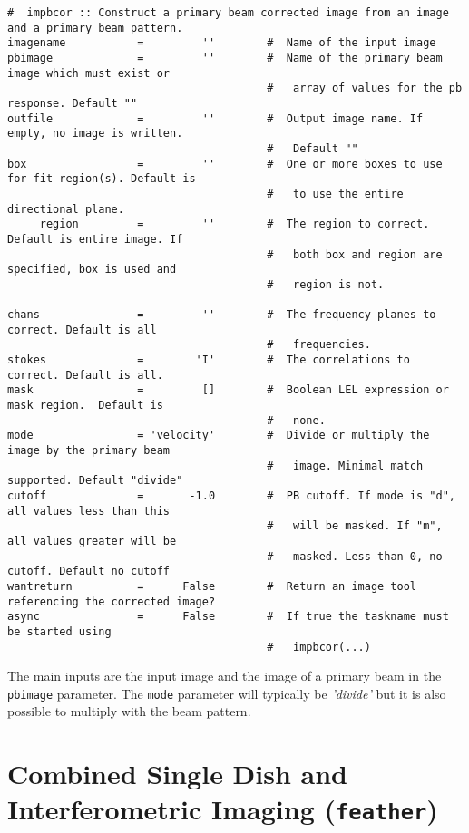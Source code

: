 \small
\begin{verbatim}
#  impbcor :: Construct a primary beam corrected image from an image and a primary beam pattern.
imagename           =         ''        #  Name of the input image
pbimage             =         ''        #  Name of the primary beam image which must exist or
                                        #   array of values for the pb response. Default ""
outfile             =         ''        #  Output image name. If empty, no image is written.
                                        #   Default ""
box                 =         ''        #  One or more boxes to use for fit region(s). Default is
                                        #   to use the entire directional plane.
     region         =         ''        #  The region to correct. Default is entire image. If
                                        #   both box and region are specified, box is used and
                                        #   region is not.

chans               =         ''        #  The frequency planes to correct. Default is all
                                        #   frequencies.
stokes              =        'I'        #  The correlations to correct. Default is all.
mask                =         []        #  Boolean LEL expression or mask region.  Default is
                                        #   none.
mode                = 'velocity'        #  Divide or multiply the image by the primary beam
                                        #   image. Minimal match supported. Default "divide"
cutoff              =       -1.0        #  PB cutoff. If mode is "d", all values less than this
                                        #   will be masked. If "m", all values greater will be
                                        #   masked. Less than 0, no cutoff. Default no cutoff
wantreturn          =      False        #  Return an image tool referencing the corrected image?
async               =      False        #  If true the taskname must be started using
                                        #   impbcor(...)
\end{verbatim}
\normalsize                             

The main inputs are the input image and the image of a primary beam in
the {\tt pbimage} parameter. The {\tt mode} parameter will typically
be {\it 'divide'} but it is also possible to multiply with the beam
pattern.

\section{Combined Single Dish and Interferometric Imaging 
         ({\tt feather})}
\label{section:im.feather}

